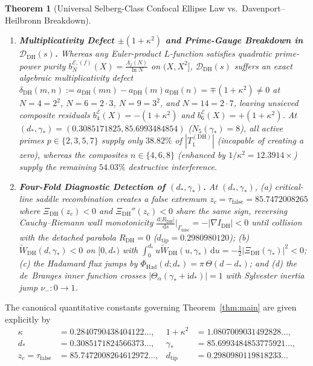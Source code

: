 \documentclass[11pt,reqno]{amsart}
\newtheorem{theorem}{Theorem}[section]
\theoremstyle{definition}
\theoremstyle{remark}
\numberwithin{equation}{section}
\newcommand{\dd}{\mathrm{d}}
\newcommand{\ii}{\mathrm{i}}
\newcommand{\DHf}{\mathrm{DH}}
\begin{document}
\begin{theorem}[Universal Selberg-Class Confocal Ellipse Law vs.\ Davenport--Heilbronn Breakdown]
\begin{enumerate}[label=\textup{(\roman*)},leftmargin=2.2em]
\item \textbf{Multiplicativity Defect $\pm(1+\kappa^2)$ and Prime-Gauge Breakdown in $\mathcal{D}_{\DHf}(s)$.} Whereas any Euler-product $L$-function satisfies quadratic prime-power purity $b_N^{\mathcal{E},(f)}(X) = \frac{\Lambda_f(N)}{\ln N}$ on $(X, X^2]$, $\mathcal{D}_{\DHf}(s)$ suffers an exact algebraic multiplicativity defect $\delta_{\DHf}(m,n) := a_{\DHf}(mn) - a_{\DHf}(m)a_{\DHf}(n) = \mp(1+\kappa^2) \neq 0$ at $N = 4 = 2^2$, $N = 6 = 2\cdot 3$, $N = 9 = 3^2$, and $N = 14 = 2\cdot 7$, leaving unsieved composite residuals $b_4^{\mathcal{E}}(X) = -(1+\kappa^2)$ and $b_6^{\mathcal{E}}(X) = +(1+\kappa^2)$. At $(d_*, \gamma_*) = (0.3085171825, 85.6993484854)$ ($N_5(\gamma_*) = 8$), all active primes $p \in \{2,3,5,7\}$ supply only $38.82\%$ of $|T_1^{(\DHf)}|$ (incapable of creating a zero), whereas the composites $n \in \{4,6,8\}$ (enhanced by $1/\kappa^2 = 12.3914\times$) supply the remaining $54.03\%$ destructive interference.
\item \textbf{Four-Fold Diagnostic Detection of $(d_*, \gamma_*)$.} At $(d_*, \gamma_*)$, (a) critical-line saddle recombination creates a false extremum $z_c = \tau_{\mathrm{false}} = 85.7472008265$ where $\Xi_{\DHf}(z_c) < 0$ and $\Xi_{\DHf}''(z_c) < 0$ share the same sign, reversing Cauchy--Riemann wall monotonicity $\frac{\dd|R_{\DHf}|}{\dd s}\big|_{\Gamma_{\mathrm{false}}} = -|\nabla I_{\DHf}| < 0$ until collision with the detached parabola $R_{\DHf} = 0$ ($d_{\mathrm{tip}} = 0.2980980120$); (b) $\widetilde{W}_{\DHf}(d,\gamma_*) < 0$ on $[0, d_*)$ with $\int_0^{d_*} u\widetilde{W}_{\DHf}(u,\gamma_*)\,\dd u = -\frac{1}{2}|\Xi_{\DHf}(\gamma_*)|^2 < 0$; (c) the Hadamard flux jumps by $\Phi_{\mathrm{Had}}(d; d_*) = \pi\,\Theta(d - d_*)$; and (d) the de~Branges inner function crosses $|\Theta_\alpha(\gamma_* + \ii d_*)| = 1$ with Sylvester inertia jump $\nu_- : 0 \to 1$.
\end{enumerate}
\end{theorem}

The canonical quantitative constants governing Theorem~\ref{thm:main} are given explicitly by
\begin{equation}\label{eq:canonical_constants}
\begin{aligned}
\kappa &= 0.2840790438404122\dots, & 1 + \kappa^2 &= 1.0807009031492828\dots, \\
d_* &= 0.3085171824566373\dots, & \gamma_* &= 85.6993484853775921\dots, \\
z_c = \tau_{\mathrm{false}} &= 85.7472008264612972\dots, & d_{\mathrm{tip}} &= 0.2980980119818233\dots
\end{aligned}
\end{equation}
\end{document}
